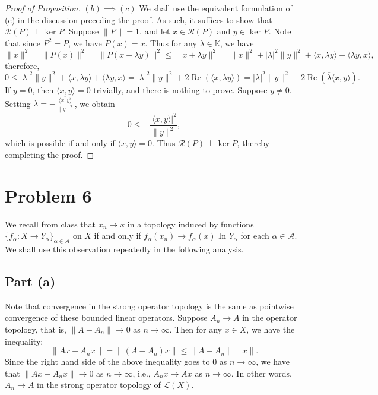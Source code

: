 \documentclass[11pt]{article}
\theoremstyle{thmstyle}
\theoremstyle{defstyle}
\newcommand{\R}{\mathbb{R}}
\newcommand{\bbC}{\mathbb{C}}
\newcommand{\K}{\mathbb{K}} %
\newcommand{\calR}{\mathcal{R}} %
\newcommand{\scrA}{\mathscr{A}}
\renewcommand{\le}{\leqslant}
\newcommand{\calL}{\mathcal{L}}
\renewcommand{\Re}{\operatorname{Re}}
\begin{document}
\begin{proof}[Proof of Proposition]
    $\boxed{(b)\implies(c)}$ We shall use the equivalent formulation of (c) in the discussion preceding the proof. As such, it suffices to show that $\calR(P)\perp\ker P$. Suppose $\|P\| = 1$, and let $x\in\calR(P)$ and $y\in\ker P$. Note that since $P^2 = P$, we have $P(x) = x$. Thus for any $\lambda\in\K$, we have 
    \begin{equation*}
        \|x\|^2 = \|P(x)\|^2 = \|P(x + \lambda y)\|^2\le \|x + \lambda y\|^2 = \|x\|^2 + |\lambda|^2\|y\|^2 + \langle x, \lambda y\rangle + \langle \lambda y, x\rangle,
    \end{equation*}
    therefore, 
    \begin{equation*}
        0\le |\lambda|^2\|y\|^2 + \langle x, \lambda y\rangle + \langle \lambda y, x\rangle = |\lambda|^2\|y\|^2 + 2\Re\left(\langle x, \lambda y\rangle\right) = |\lambda|^2\|y\|^2 + 2\Re\left(\overline\lambda\langle x, y\rangle\right).
    \end{equation*}
    If $y = 0$, then $\langle x, y\rangle = 0$ trivially, and there is nothing to prove. Suppose $y\ne 0$. Setting $\lambda = -\frac{\overline{\langle x, y\rangle}}{\|y\|^2}$, we obtain 
    \begin{equation*}
        0\le - \frac{|\langle x, y\rangle|^2}{\|y\|^2},
    \end{equation*}
    which is possible if and only if $\langle x, y\rangle = 0$. Thus $\calR(P)\perp\ker P$, thereby completing the proof.
\end{proof}

\section{Problem 6}

We recall from class that $x_n\to x$ in a topology induced by functions $\{f_\alpha\colon X\to Y_\alpha\}_{\alpha\in\scrA}$ on $X$ if and only if $f_\alpha(x_n)\to f_\alpha(x)$ In $Y_\alpha$ for each $\alpha\in\scrA$. We shall use this observation repeatedly in the following analysis.

\subsection{Part (a)}

Note that convergence in the strong operator topology is the same as pointwise convergence of these bounded linear operators. Suppose $A_n\to A$ in the operator topology, that is, $\|A - A_n\|\to 0$ as $n\to\infty$. Then for any $x\in X$, we have the inequality: 
\begin{equation*}
    \|Ax - A_n x\| = \|(A - A_n)x\|\le \|A - A_n\|\|x\|.
\end{equation*}
Since the right hand side of the above inequality goes to $0$ as $n\to\infty$, we have that $\|Ax - A_n x\|\to 0$ as $n\to\infty$, i.e., $A_n x\to Ax$ as $n\to\infty$. In other words, $A_n\to A$ in the strong operator topology of $\calL(X)$.
\end{document}
